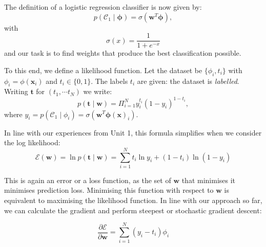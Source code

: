 The definition of a logistic regression classifier is now given by:
$$
p(\mathcal{C}_1 \mid \boldsymbol{\phi}) = \sigma(\boldsymbol{w}^T \boldsymbol{\phi}),
$$
with
$$
\sigma(x) = \frac{1}{1 + e^{-x}}
$$
and our task is to find weights that produce the best classification possible.


To this end, we define a likelihood function. Let the dataset be $\{ \phi_i, t_i \}$ with $\phi_i = \phi(\boldsymbol{x}_i)$ and $t_i \in \{ 0, 1 \}$. The labels
$t_i$ are given: the dataset is \emph{labelled}. Writing $\boldsymbol{t}$ for $(t_1, \cdots t_N)$ we write:
\begin{equation}
  p(\boldsymbol{t} \mid \boldsymbol{w}) = \Pi^N_{i=1} y^{t_i}_i ( 1 - y_i)^{1 - t_i},
  \label{eq-logllh}
\end{equation}
where $y_i = p(\mathcal{C}_1 \mid \phi_i) = \sigma(\boldsymbol{w}^T \boldsymbol{\phi}(\boldsymbol{x})_i)$.

In line with our experiences from Unit 1, this formula simplifies when we consider the  log likelihood:
\begin{equation}
\mathcal{E}(\boldsymbol{w}) = \ln p(\boldsymbol{t} \mid \boldsymbol{w} ) = \sum^N_{i=1} t_i \ln y_i + (1 - t_i) \ln ( 1 -  y_i) 
\label{eq-cross}
\end{equation}

This is again  an error or a loss function, as the set of $\boldsymbol{w}$ that minimises it  minimises prediction loss.
Minimising this function with respect to $\boldsymbol{w}$ is equivalent to maximising the likelihood function. 
In line with our approach so far, we can calculate the gradient and perform steepest or stochastic gradient descent:

\begin{equation}
  \frac{\partial \mathcal{E}}{\partial \boldsymbol{w}} = \sum^N_{i=1}(y_i - t_i)\phi_i
  \label{eq-crossgrad}
\end{equation}

